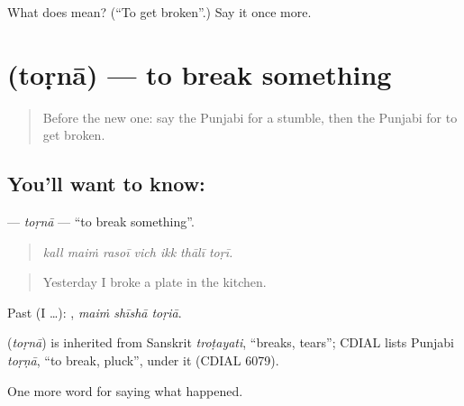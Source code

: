 \begin{tcolorbox}[breakable,colback=teal!4,colframe=teal!35!black,title={Before you move on}]
What does  mean? (\textquotedblleft{}To get broken\textquotedblright{}.) Say it once more.
\end{tcolorbox}
\section[\texorpdfstring{\pa{ਤੋੜਨਾ} (toṛnā)}{ਤੋੜਨਾ (toṛnā)}]{ (toṛnā) — to break something}

\label{lesson:PA-C310-torna}



\begin{quote}
Before the new one: say the Punjabi for a stumble, then the Punjabi for to get broken.
\end{quote}

\subsection*{You'll want to know: }
\textbf{} — \emph{toṛnā} — \textquotedblleft{}to break something\textquotedblright{}.

\begin{quote}
      
\end{quote}

\begin{quote}
\emph{kall maiṁ rasoī vich ikk thālī toṛī.}
\end{quote}

\begin{quote}
Yesterday I broke a plate in the kitchen.
\end{quote}

Past (I …):   , \emph{maiṁ shīshā toṛiā}.

\begin{cousinweb}
\textbf{} (\emph{toṛnā}) is inherited from Sanskrit \emph{troṭayati}, \textquotedblleft{}breaks, tears\textquotedblright{}; CDIAL lists Punjabi \emph{toṛṇā}, \textquotedblleft{}to break, pluck\textquotedblright{}, under it (CDIAL 6079).
\end{cousinweb}

\begin{grammarlens}[title={What you've built}]
One more word for saying what happened.
\end{grammarlens}

